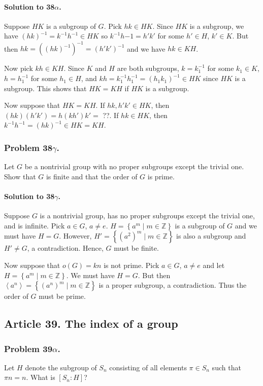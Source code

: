 \paragraph*{Solution to 38$\alpha$.}
Suppose $HK$ is a subgroup of $G$. Pick $hk \in HK$. Since $HK$ is a subgroup,
we have $(hk)^{-1} = k^{-1}h^{-1} \in HK$ so $k^{-1}h{-1} = h'k'$ for some
$h' \in H$, $k' \in K$. But then $hk = ((hk)^{-1})^{-1} = (h'k')^{-1}$ and
we have $hk \in KH$.

Now pick $kh \in KH$. Since $K$ and $H$ are both subgroups, $k = k_1^{-1}$ for
some $k_1 \in K$, $h = h_1^{-1} $ for some $h_1 \in H$, and
$kh = k_1^{-1}h_1^{-1} = (h_1 k_1)^{-1} \in HK$ since $HK$ is a subgroup. This
shows that $HK = KH$ if $HK$ is a subgroup.

Now suppose that $HK = KH$. If $hk, h'k' \in HK$, then $(hk)(h'k') = h(kh')k'
= $ ??.
If $hk \in HK$, then $k^{-1}h^{-1} = (hk)^{-1} \in
HK = KH$.

\subsubsection{Problem 38$\gamma$.}
Let $G$ be a nontrivial group with no proper subgroups except the trivial one.
Show that $G$ is finite and that the order of $G$ is prime.

\paragraph*{Solution to 38$\gamma$.}
Suppose $G$ is a nontrivial group, has no proper subgroups except the trivial
one, and is infinite. Pick $a \in G$, $a \neq e$. $H=\left\{ a^m \mid m \in
\mathbb{Z} \right\}$ is a subgroup of $G$ and we must have $H=G$. However,
$H' = \left\{ (a^2)^m \mid m \in \mathbb{Z}\right\}$ is also a subgroup and
$H' \neq G$, a contradiction. Hence, $G$ must be finite.

Now suppose that $o(G) = kn$ is not prime. Pick $a\in G$, $a\neq e$ and let
$H = \left\{ a^m \mid m \in \mathbb{Z} \right\}$. We must have $H=G$. But then
$\left<a^n\right> = \left\{ (a^n)^m \mid m \in \mathbb{Z} \right\}$ is a proper subgroup,
a contradiction. Thus the order of $G$ must be prime.

\subsection{Article 39. The index of a group}
\subsubsection{Problem 39$\alpha$.}
Let $H$ denote the subgroup of $S_n$ consisting of all elements $\pi \in S_n$
such that $\pi n = n$. What is $[S_n:H]$?

